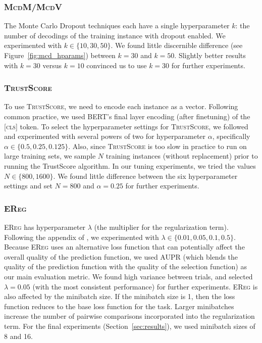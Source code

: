 \documentclass[11pt]{article}
\begin{document}
\subsubsection*{\textsc{McdM/McdV}}

The Monte Carlo Dropout techniques each have a single hyperparameter $k$: the number of decodings of the training instance with dropout enabled. We experimented with $k \in \{10, 30, 50\}$. We found little discernible difference (see Figure~\ref{fig:mcd_hparams}) between $k=30$ and $k=50$. Slightly better results with $k=30$ versus $k=10$ convinced us to use $k=30$ for further experiments.


\subsubsection*{\textsc{TrustScore}}

To use \textsc{TrustScore}, we need to encode each instance as a vector. Following common practice, we used BERT's final layer encoding (after finetuning) of the \textsc{[cls]} token. To select the hyperparameter settings for \textsc{TrustScore}, we followed \cite{jiang2018trust} and experimented with several powers of two for hyperparameter $\alpha$, specifically $\alpha \in \{0.5, 0.25, 0.125\}$. Also, since \textsc{TrustScore} is too slow in practice to run on large training sets, we sample $N$ training instances (without replacement) prior to running the TrustScore algorithm. In our tuning experiments, we tried the values $N \in \{800, 1600\}$. We found little difference between the six hyperparameter settings and set $N=800$ and $\alpha=0.25$ for further experiments.

\subsubsection*{\textsc{EReg}}

\textsc{EReg} has hyperparameter $\lambda$ (the multiplier for the regularization term). Following the appendix of \cite{xin-etal-2021-art}, we experimented with $\lambda \in \{0.01, 0.05, 0.1, 0.5\}$. Because \textsc{EReg} uses an alternative loss function that can potentially affect the overall quality of the prediction function, we used AUPR (which blends the quality of the prediction function with the quality of the selection function) as our main evaluation metric. We found high variance between trials, and selected $\lambda = 0.05$ (with the most consistent performance) for further experiments. \textsc{EReg} is also affected by the minibatch size. If the minibatch size is 1, then the loss function reduces to the base loss function for the task. Larger minibatches increase the number of pairwise comparisons incorporated into the regularization term. For the final experiments (Section~\ref{sec:results}), we used minibatch sizes of 8 and 16.
\end{document}
